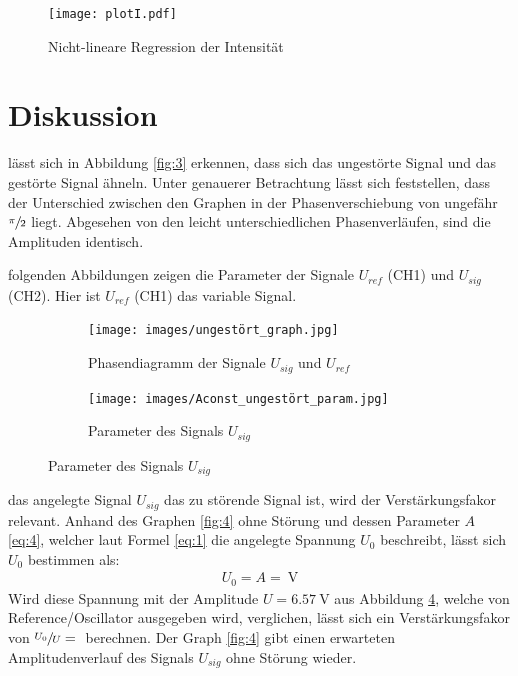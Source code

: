 \begin{figure}[H]
    \centering
    \texttt{[image: plotI.pdf]}
    \caption{Nicht-lineare Regression der Intensität}
    \label{fig:6}
\end{figure}


\section{Diskussion} \label{sec:6}

\justifying lässt sich in Abbildung \ref{fig:3} erkennen, dass sich das ungestörte Signal und das gestörte Signal ähneln. Unter 
genauerer Betrachtung lässt sich feststellen, dass der Unterschied zwischen den Graphen in der Phasenverschiebung von ungefähr $\sfrac{\pi}{2}$
liegt. Abgesehen von den leicht unterschiedlichen Phasenverläufen, sind die Amplituden identisch. 


\justifying folgenden Abbildungen zeigen die Parameter der Signale $U_{ref}$ (CH1) und $U_{sig}$ (CH2). Hier ist $U_{ref}$ (CH1)
das variable Signal.

\begin{figure}[H] 
\caption{Funktionalität des Gleichrichters}
\label{fig:7}
    \begin{subfigure}{0.495\linewidth}
        \centering
        \texttt{[image: images/ungestört\_graph.jpg]}
        \caption{Phasendiagramm der Signale $U_{sig}$ und $U_{ref}$}
        \label{fig:7a}
    \end{subfigure}
    \begin{subfigure}{0.495\linewidth}
        \centering
        \texttt{[image: images/Aconst\_ungestört\_param.jpg]}
        \caption{Parameter des Signals $U_{sig}$}
        \label{fig:7b}
    \end{subfigure}
\end{figure}

\justifying das angelegte Signal $U_{sig}$ das zu störende Signal ist, wird der Verstärkungsfakor relevant.
Anhand des Graphen \ref{fig:4} ohne Störung und dessen Parameter $A$ \eqref{eq:4}, welcher laut Formel \eqref{eq:1} die angelegte Spannung $U_0$ 
beschreibt, lässt sich $U_0$ bestimmen als:
\begin{align}
    U_0 = A = \text{}\SI{}{\volt}
\end{align}
Wird diese Spannung mit der Amplitude $U = \SI{6.57}{\volt}$ aus Abbildung \ref{fig:7b}, welche von Reference/Oscillator ausgegeben wird, verglichen, 
lässt sich ein Verstärkungsfakor von $\sfrac{U_0}{U} = \text{}$ berechnen. Der Graph \ref{fig:4} gibt einen erwarteten Amplitudenverlauf 
des Signals $U_{sig}$ ohne Störung wieder. 

